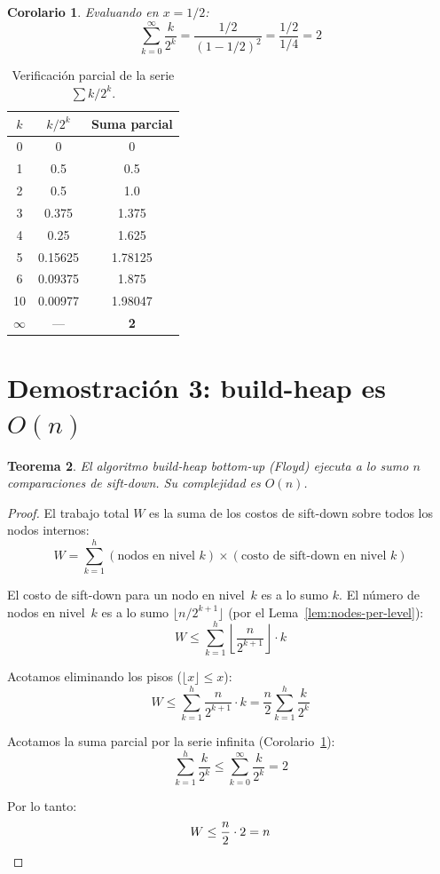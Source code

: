 \documentclass[11pt, letterpaper]{article}
\theoremstyle{definition}
\theoremstyle{plain}
\newtheorem{theorem}{Teorema}[section]
\newtheorem{corollary}[theorem]{Corolario}
\theoremstyle{remark}
\begin{document}
\begin{corollary}\label{cor:series-half}
Evaluando en $x = 1/2$:
\[
  \sum_{k=0}^{\infty} \frac{k}{2^k}
  = \frac{1/2}{(1 - 1/2)^2}
  = \frac{1/2}{1/4} = 2
\]
\end{corollary}

\begin{table}[h]
\centering
\caption{Verificación parcial de la serie $\sum k/2^k$.}
\begin{tabular}{ccc}
\toprule
$k$ & $k/2^k$ & Suma parcial \\
\midrule
0 & 0       & 0      \\
1 & 0.5     & 0.5    \\
2 & 0.5     & 1.0    \\
3 & 0.375   & 1.375  \\
4 & 0.25    & 1.625  \\
5 & 0.15625 & 1.78125 \\
6 & 0.09375 & 1.875  \\
10 & 0.00977 & 1.98047 \\
$\infty$ & --- & \textbf{2} \\
\bottomrule
\end{tabular}
\end{table}

\section{Demostración 3: build-heap es
  \texorpdfstring{$O(n)$}{O(n)}}

\begin{theorem}\label{thm:build-heap}
El algoritmo build-heap bottom-up (Floyd) ejecuta a lo sumo $n$
comparaciones de sift-down. Su complejidad es $O(n)$.
\end{theorem}

\begin{proof}
El trabajo total $W$ es la suma de los costos de sift-down sobre
todos los nodos internos:
\[
  W = \sum_{k=1}^{h}
      (\text{nodos en nivel } k) \times
      (\text{costo de sift-down en nivel } k)
\]

El costo de sift-down para un nodo en nivel~$k$ es a lo sumo $k$.
El número de nodos en nivel~$k$ es a lo sumo
$\lfloor n / 2^{k+1} \rfloor$ (por el Lema~\ref{lem:nodes-per-level}):
\[
  W \leq \sum_{k=1}^{h}
         \left\lfloor \frac{n}{2^{k+1}} \right\rfloor \cdot k
\]

Acotamos eliminando los pisos ($\lfloor x \rfloor \leq x$):
\[
  W \leq \sum_{k=1}^{h} \frac{n}{2^{k+1}} \cdot k
       = \frac{n}{2} \sum_{k=1}^{h} \frac{k}{2^k}
\]

Acotamos la suma parcial por la serie infinita
(Corolario~\ref{cor:series-half}):
\[
  \sum_{k=1}^{h} \frac{k}{2^k}
  \leq \sum_{k=0}^{\infty} \frac{k}{2^k} = 2
\]

Por lo tanto:
\[
  W \leq \frac{n}{2} \cdot 2 = n \qedhere
\]
\end{proof}
\end{document}
